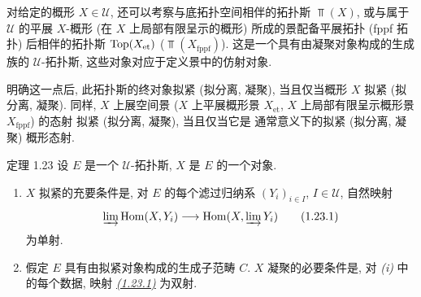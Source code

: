 \setcounter{subsection}{22}
\subsubsection{}

对给定的概形 $X\in 𝒰$,
还可以考察与底拓扑空间相伴的拓扑斯 $\Top(X)$,
或与属于 $𝒰$ 的平展 $X$-概形
(\resp 在 $X$ 上局部\pageoriginale{}有限呈示的概形)
所成的景配备平展拓扑 (\resp fppf 拓扑) 后相伴的拓扑斯
$\operatorname{Top}(X_{\mathrm{et}})$ (\resp $\Top(X_{\text{fppf}})$).
这是一个具有由凝聚对象构成的生成族的 $𝒰$-拓扑斯,
这些对象对应于定义景中的仿射对象.

明确这一点后, 此拓扑斯的终对象拟紧 (\resp 拟分离, \resp 凝聚),
当且仅当概形 $X$ 拟紧 (\resp 拟分离, \resp 凝聚).
同样, $X$ 上展空间景
(\resp $X$ 上平展概形景 $X_{\text{et}}$,
\resp $X$ 上局部有限呈示概形景 $X_{\text{fppf}}$) 的态射
拟紧 (\resp 拟分离, \resp 凝聚),
当且仅当它是 \loccit{} 通常意义下的拟紧
(\resp 拟分离, \resp 凝聚) 概形态射.

\begin{enonce*}{定理 1.23}
设 $E$ 是一个 $𝒰$-拓扑斯, $X$ 是 $E$ 的一个对象.
\begin{enumerate}
\renewcommand{\theenumi}{\roman{enumi}}
\renewcommand{\labelenumi}{(\theenumi)}
\item $X$ 拟紧的充要条件是,
对 $E$ 的每个滤过归纳系 $(Y_i)_{i\in I}$, $I\in 𝒰$,
自然映射
\begin{equation*}
\varinjlim  \Hom(X, Y_i) \to \Hom(X, \varinjlim Y_i)\tag{1.23.1}
\end{equation*}
为单射.

\item 假定 $E$ 具有由拟紧对象构成的生成子范畴 $C$.
$X$ 凝聚的必要条件是,
对 \emph{(i)} 中的每个数据,
映射 \emph{\hyperref[VI.eq1.23.1]{(1.23.1)}} 为双射.
\end{enumerate}
\end{enonce*}

